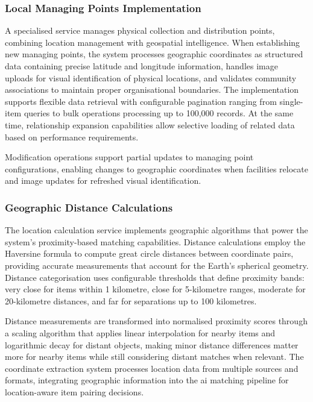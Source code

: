 \subsubsection{Local Managing Points Implementation}

A specialised service manages physical collection and distribution points, combining location management with geospatial intelligence. When establishing new managing points, the system processes geographic coordinates as structured data containing precise latitude and longitude information, handles image uploads for visual identification of physical locations, and validates community associations to maintain proper organisational boundaries. The implementation supports flexible data retrieval with configurable pagination ranging from single-item queries to bulk operations processing up to 100,000 records. At the same time, relationship expansion capabilities allow selective loading of related data based on performance requirements.

Modification operations support partial updates to managing point configurations, enabling changes to geographic coordinates when facilities relocate and image updates for refreshed visual identification.

\subsubsection{Geographic Distance Calculations}

The location calculation service implements geographic algorithms that power the system's proximity-based matching capabilities. Distance calculations employ the Haversine formula \cite{Roy2022} to compute great circle distances between coordinate pairs, providing accurate measurements that account for the Earth's spherical geometry. Distance categorisation uses configurable thresholds that define proximity bands: very close for items within 1 kilometre, close for 5-kilometre ranges, moderate for 20-kilometre distances, and far for separations up to 100 kilometres.

Distance measurements are transformed into normalised proximity scores through a scaling algorithm that applies linear interpolation for nearby items and logarithmic decay for distant objects, making minor distance differences matter more for nearby items while still considering distant matches when relevant. The coordinate extraction system processes location data from multiple sources and formats, integrating geographic information into the \ac{ai} matching pipeline for location-aware item pairing decisions.


